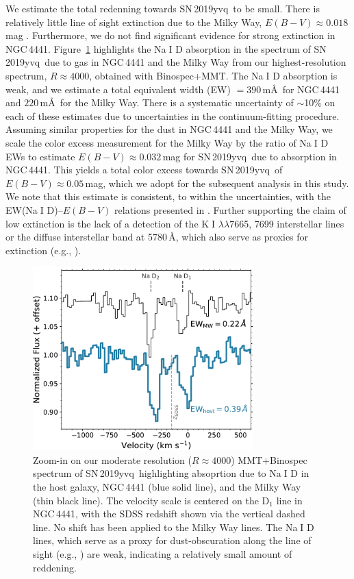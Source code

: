 \documentclass[twocolumn]{aastex63}
\def\ion#1#2{#1$\;${\footnotesize\rm{#2}}\relax}
\newcommand{\frommb}[1]{{\color{purple} fromMB: {#1}}}
\newcommand{\sn}{SN\,2019yvq}
\begin{document}
We estimate the total redenning towards \sn\ to be small. There is relatively
little line of sight extinction due to the Milky Way, $E(B-V) \approx
0.018$\,mag \citep{Schlafly11, Schlegel98}. Furthermore, we do not find
significant evidence for strong extinction in NGC\,4441. Figure~\ref{fig:NaD}
highlights the \ion{Na}{I} D absorption in the spectrum of \sn\ due to gas in
NGC\,4441 and the Milky Way from our highest-resolution spectrum, $R \approx
4000$, obtained with Binospec+MMT. The \ion{Na}{I} D absorption is weak, and
we estimate a total equivalent width (EW) $= 390$\,m\AA\ for NGC\,4441 and
$220$\,m\AA\ for the Milky Way. There is a systematic uncertainty of
$\sim$10\% on each of these estimates due to uncertainties in the
continuum-fitting procedure. Assuming similar properties for the dust in
NGC\,4441 and the Milky Way, we scale the color excess measurement for the
Milky Way by the ratio of \ion{Na}{I} D EWs to estimate $E(B-V) \approx
0.032$\,mag for \sn\ due to absorption in NGC\,4441. This yields a total color
excess towards \sn\ of $E(B-V) \approx 0.05$\,mag, which we adopt for the
subsequent analysis in this study. We note that this estimate is consistent,
to within the uncertainties, with the EW(\ion{Na}{I} D)--$E(B-V)$ relations
presented in \citet{Poznanski12}. Further supporting the claim of low
extinction is the lack of a detection of the \ion{K}{I} $\lambda\lambda$7665,
7699 interstellar lines or the diffuse interstellar band at 5780\,\AA, which
also serve as proxies for extinction (e.g., \citealt{Phillips13}).

\begin{figure}
    \centering
    \includegraphics[width=3.35in]{./figures/NaD.pdf}
    \caption{Zoom-in on our moderate resolution ($R \approx 4000$)
    MMT+Binospec spectrum of \sn\ highlighting absoprtion due to \ion{Na}{I}
    D in the host galaxy, NGC\,4441 (blue solid line), and the Milky Way
    (thin black line). The velocity scale is centered on the D$_1$ line in
    NGC\,4441, with the SDSS redshift shown via the vertical dashed line. No
    shift has been applied to the Milky Way lines. The \ion{Na}{I} D lines,
    which serve as a proxy for dust-obscuration along the line of sight
    (e.g., \citealt{Poznanski12,Phillips13}) are weak, indicating a
    relatively small amount of reddening.}
    \label{fig:NaD}
\end{figure}
\end{document}
